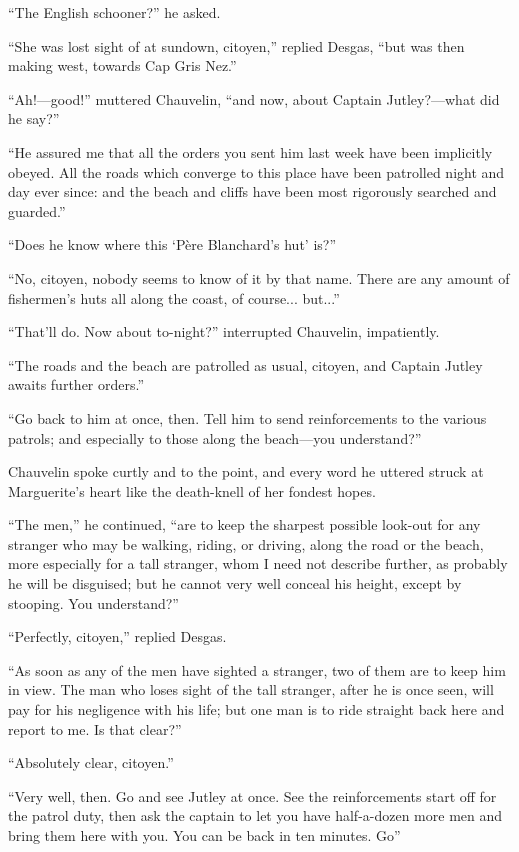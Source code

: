 \enquote{The English schooner?} he asked.

\enquote{She was lost sight of at sundown, citoyen,} replied Desgas, \enquote{but was then making west, towards Cap Gris Nez.}

\enquote{Ah!---good!\longdash} muttered Chauvelin, \enquote{and now, about Captain Jutley?---what did he say?}

\enquote{He assured me that all the orders you sent him last week have been implicitly obeyed. All the roads which converge to this place have been patrolled night and day ever since: and the beach and cliffs have been most rigorously searched and guarded.}

\enquote{Does he know where this \enquote{Père Blanchard's hut} is?}

\enquote{No, citoyen, nobody seems to know of it by that name. There are any amount of fishermen's huts all along the coast, of course... but...}

\enquote{That'll do. Now about to-night?} interrupted Chauvelin, impatiently.

\enquote{The roads and the beach are patrolled as usual, citoyen, and Captain Jutley awaits further orders.}

\enquote{Go back to him at once, then. Tell him to send reinforcements to the various patrols; and especially to those along the beach---you understand?}

Chauvelin spoke curtly and to the point, and every word he uttered struck at Marguerite's heart like the death-knell of her fondest hopes.

\enquote{The men,} he continued, \enquote{are to keep the sharpest possible look-out for any stranger who may be walking, riding, or driving, along the road or the beach, more especially for a tall stranger, whom I need not describe further, as probably he will be disguised; but he cannot very well conceal his height, except by stooping. You understand?}

\enquote{Perfectly, citoyen,} replied Desgas.

\enquote{As soon as any of the men have sighted a stranger, two of them are to keep him in view. The man who loses sight of the tall stranger, after he is once seen, will pay for his negligence with his life; but one man is to ride straight back here and report to me. Is that clear?}

\enquote{Absolutely clear, citoyen.}

\enquote{Very well, then. Go and see Jutley at once. See the reinforcements start off for the patrol duty, then ask the captain to let you have half-a-dozen more men and bring them here with you. You can be back in ten minutes. Go\longdash}

